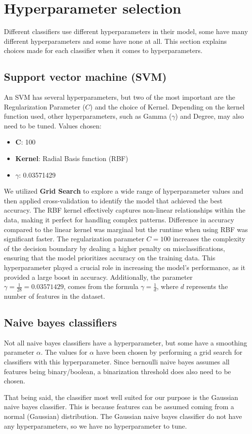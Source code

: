 \section{Hyperparameter selection}
Different classifiers use different hyperparameters in their model, some have many different hyperparameters and some have none at all. 
This section explains choices made for each classifier when it comes to hyperparameters.

\subsection{Support vector machine (SVM)}

An SVM has several hyperparameters, but two of the most important are the Regularization Parameter 
(\(C\)) and the choice of Kernel. Depending on the kernel function used, other hyperparameters, such as Gamma 
(\(\gamma\)) and Degree, may also need to be tuned. Values chosen:

\begin{itemize}
    \item \textbf{\(\boldsymbol{C}\)}: 100
    \item \textbf{Kernel}: Radial Basis function (RBF)
    \item \textbf{\(\gamma\)}: 0.03571429
\end{itemize}
We utilized \textbf{Grid Search} to explore a wide range of hyperparameter values and then applied cross-validation to identify the model that achieved the best accuracy. 
The RBF kernel effectively captures non-linear relationships within the data, making it perfect for handling complex patterns. Difference in accuracy compared to the linear kernel was marginal but the runtime when using RBF was significant faster.
The regularization parameter \(C = 100\) increases the complexity of the decision boundary by dealing a higher penalty on misclassifications, ensuring that the model prioritizes accuracy on the training data. This hyperparameter played a crucial role in increasing the model's performance, as it provided a large boost in accuracy. 
Additionally, the parameter \(\gamma = \frac{1}{28} = 0.03571429\), comes from the formula \(\gamma = \frac{1}{d}\), where \(d\) represents the number of features in the dataset.

\subsection{Naive bayes classifiers}
Not all naive bayes classifiers have a hyperparameter, but some have a smoothing parameter $\alpha$. The values for $\alpha$ have been chosen by performing a grid search for classifiers with this hyperparameter. Since bernoulli naive bayes assumes all features being binary/boolean, a binarization threshold does also need to be chosen. 
\par
That being said, the classifier most well suited for our purpose is the Gaussian naive bayes classifier. This is because features can be assumed coming from a normal (Gaussian) distribution. The Gaussian naive bayes classifier do not have any hyperparameters, so we have no hyperparameter to tune. 

